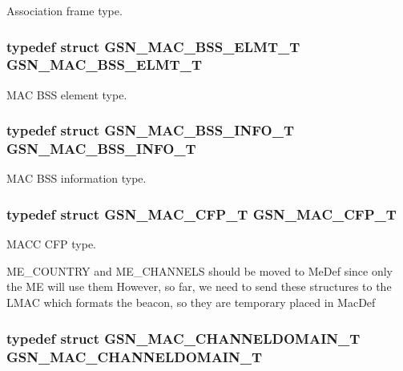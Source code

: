 Association frame type. 

\hypertarget{a00642_ga741210948f906164f06f08b1b4705da8}{
\subsubsection[{GSN\_\-MAC\_\-BSS\_\-ELMT\_\-T}]{\setlength{\rightskip}{0pt plus 5cm}typedef struct {\bf GSN\_\-MAC\_\-BSS\_\-ELMT\_\-T}  {\bf GSN\_\-MAC\_\-BSS\_\-ELMT\_\-T}}}
\label{a00642_ga741210948f906164f06f08b1b4705da8}


MAC BSS element type. 

\hypertarget{a00642_ga991bb63d940b90bac4f74912786f521d}{
\subsubsection[{GSN\_\-MAC\_\-BSS\_\-INFO\_\-T}]{\setlength{\rightskip}{0pt plus 5cm}typedef struct {\bf GSN\_\-MAC\_\-BSS\_\-INFO\_\-T}  {\bf GSN\_\-MAC\_\-BSS\_\-INFO\_\-T}}}
\label{a00642_ga991bb63d940b90bac4f74912786f521d}


MAC BSS information type. 

\hypertarget{a00642_gad5d3559fa1fc09e64eb23e72d14a503a}{
\subsubsection[{GSN\_\-MAC\_\-CFP\_\-T}]{\setlength{\rightskip}{0pt plus 5cm}typedef struct {\bf GSN\_\-MAC\_\-CFP\_\-T}  {\bf GSN\_\-MAC\_\-CFP\_\-T}}}
\label{a00642_gad5d3559fa1fc09e64eb23e72d14a503a}


MACC CFP type. 

ME\_\-COUNTRY and ME\_\-CHANNELS should be moved to MeDef since only the ME will use them However, so far, we need to send these structures to the LMAC which formats the beacon, so they are temporary placed in MacDef \hypertarget{a00642_ga8ff4cc41b9827ad704cb982edb371b48}{
\subsubsection[{GSN\_\-MAC\_\-CHANNELDOMAIN\_\-T}]{\setlength{\rightskip}{0pt plus 5cm}typedef struct {\bf GSN\_\-MAC\_\-CHANNELDOMAIN\_\-T}  {\bf GSN\_\-MAC\_\-CHANNELDOMAIN\_\-T}}}
\label{a00642_ga8ff4cc41b9827ad704cb982edb371b48}


